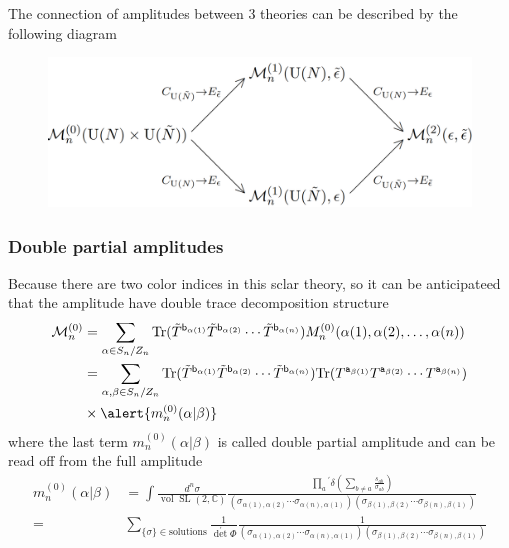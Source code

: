 \documentclass{beamer}
\begin{document}
\begin{frame}
    The connection of amplitudes between 3 theories can be described by the following diagram 
    \begin{figure}[htb]
        \centering
        \includegraphics[width=1\linewidth]{main.png}
    \end{figure}
\end{frame}
\begin{frame}
    \frametitle{Double partial amplitudes}
    Because there are two color indices in this sclar theory, so it can be anticipateed that the amplitude
    have double trace decomposition structure
    \begin{align*}
        \mathcal{M}_n^{(0)}&=\sum_{\alpha\in S_n/Z_n}\mathrm{Tr}(\tilde{T}^{\mathsf{b}_{\alpha(1)}}\tilde{T}^{\mathsf{b}_{\alpha(2)}}\cdots\tilde{T}^{\mathsf{b}_{\alpha(n)}})M_n^{(0)}(\alpha(1),\alpha(2),\ldots,\alpha(n))\\
        &=\sum_{\alpha,\beta\in S_n/Z_n}\mathrm{Tr}(\tilde{T}^{\mathsf{b}_{\alpha(1)}}\tilde{T}^{\mathsf{b}_{\alpha(2)}}\cdots\tilde{T}^{\mathsf{b}_{\alpha(n)}})\text{Tr}(T^{\mathtt{a}_{\beta(1)}}T^{\mathtt{a}_{\beta(2)}}\cdots T^{\mathtt{a}_{\beta(n)}})\\
        &\times \alert{m_n^{(0)}(\alpha|\beta)}
    \end{align*} 
    where the last term $m_n^{(0)}(\alpha|\beta)$ is called \alert{double partial amplitude} and can be read off from the full amplitude
    \pause
    \begin{align*}
    m_{n}^{(0)}(\alpha|\beta)&=\int\frac{d^{n}\sigma}{\operatorname{vol}\operatorname{SL}(2,\mathbb{C})}\frac{\prod_{a}{}^{\prime}\delta(\sum_{b\neq a}\frac{s_{ab}}{\sigma_{ab}})}{(\sigma_{\alpha(1),\alpha(2)}\cdots\sigma_{\alpha(n),\alpha(1)})(\sigma_{\beta(1),\beta(2)}\cdots\sigma_{\beta(n),\beta(1)})}\\
    =&\sum_{\{\sigma\}\in\mathrm{solutions}}\frac1{\det^{\prime}\Phi}\frac{1}{(\sigma_{\alpha(1),\alpha(2)}\cdots\sigma_{\alpha(n),\alpha(1)})(\sigma_{\beta(1),\beta(2)}\cdots\sigma_{\beta(n),\beta(1)})}
    \end{align*}

\end{frame}
\end{document}
